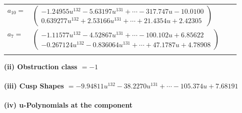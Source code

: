 \documentclass[1p]{elsarticle_modified}
\theoremstyle{definition}
\begin{document}
\begin{tabular}{m{7pt} m{180pt} m{7pt} m{180pt} }
\flushright $a_{10}=$&$\begin{pmatrix}-1.24955 u^{132}-5.63197 u^{131}+\cdots-317.747 u-10.0100\\0.639277 u^{132}+2.53166 u^{131}+\cdots+21.4354 u+2.42305\end{pmatrix}$ \\
\flushright $a_{7}=$&$\begin{pmatrix}-1.11577 u^{132}-4.52867 u^{131}+\cdots-100.102 u+6.85622\\-0.267124 u^{132}-0.836064 u^{131}+\cdots+47.1787 u+4.78908\end{pmatrix}$\\&\end{tabular}
\flushleft \textbf{(ii) Obstruction class $= -1$}\\~\\
\flushleft \textbf{(iii) Cusp Shapes $= -9.94811 u^{132}-38.2270 u^{131}+\cdots-105.374 u+7.68191$}\\~\\
\newpage\renewcommand{\arraystretch}{1}
\flushleft \textbf{(iv) u-Polynomials at the component}\newline \\
\end{document}
